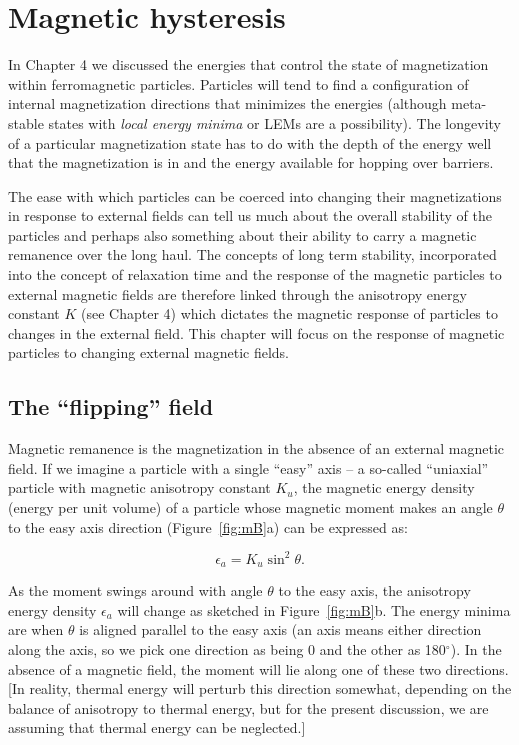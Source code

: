 \chapter {Magnetic hysteresis}




In Chapter  4 we discussed the energies  that control the state of magnetization within ferromagnetic particles.    Particles will tend to find a configuration of internal magnetization directions that minimizes the energies (although meta-stable states with 
{\it local energy minima} or LEMs are a possibility).    The longevity of a particular magnetization state has to do with the depth of the energy well that the magnetization is in and the energy available for hopping over barriers.  

The ease with which particles can be coerced  into changing their magnetizations in response to external fields can tell us much about the overall stability of the particles and perhaps also something about their ability to carry a magnetic remanence over the long haul.   The concepts of long term stability, incorporated into the concept of relaxation time and the response of  the magnetic particles  to external magnetic fields are therefore linked through the anisotropy energy constant $K$ (see Chapter  4) which  dictates the magnetic response of particles to changes in the external field.   This chapter will focus on  the response of magnetic particles to changing external magnetic fields.  



\section{The ``flipping'' field}
\label{sect:flipping}

Magnetic remanence is the magnetization in the absence of an external magnetic field.   If we imagine a particle with a single ``easy'' axis --  a so-called ``uniaxial'' particle with magnetic anisotropy constant $K_u$, the  magnetic energy density (energy per unit volume) of a particle whose magnetic moment makes an angle $\theta$ to the easy axis direction (Figure~\ref{fig:mB}a)  can be expressed as: 

$$
\epsilon_a = K_u\sin^2\theta.
$$


\noindent  As the moment swings around with angle $\theta$ to the easy axis, the anisotropy energy density $\epsilon_a$ will change as sketched in Figure~\ref{fig:mB}b.  The energy minima are when $\theta$ is aligned parallel to  the easy axis (an axis means either direction along the axis, so we pick one direction as being  0 and the other as 180$^{\circ}$).  In the absence of a magnetic field, the moment will lie along one of these two directions.  [In reality, thermal energy will perturb this direction somewhat, depending on the balance of anisotropy to thermal energy, but for the present discussion, we are assuming that thermal energy can be neglected.]  

